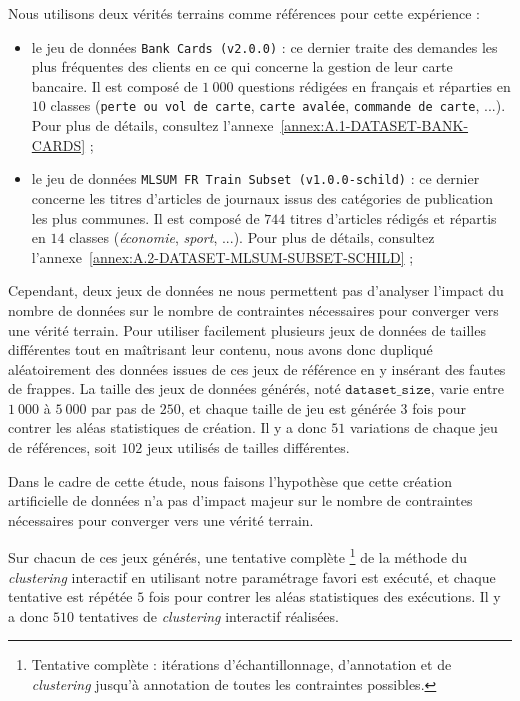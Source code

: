 			Nous utilisons deux vérités terrains comme références pour cette expérience :
			\begin{itemize}
				\item le jeu de données \texttt{Bank Cards (v2.0.0)} : ce dernier traite des demandes les plus fréquentes des clients en ce qui concerne la gestion de leur carte bancaire. Il est composé de $1~000$ questions rédigées en français et réparties en $10$ classes (\texttt{perte ou vol de carte}, \texttt{carte avalée}, \texttt{commande de carte}, ...). Pour plus de détails, consultez l'annexe~\ref{annex:A.1-DATASET-BANK-CARDS} ;
				\item le jeu de données \texttt{MLSUM FR Train Subset (v1.0.0-schild)} : ce dernier concerne les titres d'articles de journaux issus des catégories de publication les plus communes. Il est composé de $744$  titres d'articles rédigés et répartis en $14$ classes (\textit{économie}, \textit{sport}, ...). Pour plus de détails, consultez l'annexe~\ref{annex:A.2-DATASET-MLSUM-SUBSET-SCHILD} ;
			\end{itemize}

			Cependant, deux jeux de données ne nous permettent pas d'analyser l'impact du nombre de données sur le nombre de contraintes nécessaires pour converger vers une vérité terrain.
			Pour utiliser facilement plusieurs jeux de données de tailles différentes tout en maîtrisant leur contenu, nous avons donc dupliqué aléatoirement des données issues de ces jeux de référence en y insérant des fautes de frappes.
			La taille des jeux de données générés, noté $\texttt{dataset\_size}$, varie entre $1~000$ à $5~000$ par pas de $250$, et chaque taille de jeu est générée $3$ fois pour contrer les aléas statistiques de création.
			Il y a donc $51$ variations de chaque jeu de références, soit $102$ jeux utilisés de tailles différentes.
			
			\begin{leftBarWarning}
				Dans le cadre de cette étude, nous faisons l'hypothèse que cette création artificielle de données n'a pas d'impact majeur sur le nombre de contraintes nécessaires pour converger vers une vérité terrain.
			\end{leftBarWarning}
			
			Sur chacun de ces jeux générés, une tentative complète
			\footnote{Tentative complète : itérations d'échantillonnage, d'annotation et de \textit{clustering} jusqu'à annotation de toutes les contraintes possibles.}
			de la méthode du \textit{clustering} interactif en utilisant notre paramétrage favori est exécuté, et chaque tentative est répétée $5$ fois pour contrer les aléas statistiques des exécutions.
			Il y a donc $510$ tentatives de \textit{clustering} interactif réalisées.
			
